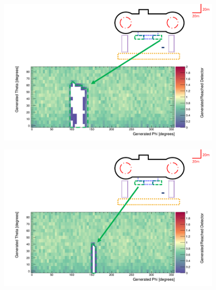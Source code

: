 \begin{figure}
 \centering
 \includegraphics[width=\linewidth]{Chapter5/Figs/wylfaRasterNew/serviceTowerCloseGen_Reached.png}
 \label{fig:serviceTowerCloseGen_Reached}
\end{figure}

\begin{figure}
 \centering
 \includegraphics[width=\linewidth]{Chapter5/Figs/wylfaRasterNew/serviceTowerFarGen_Reached.png}
 \label{fig:serviceTowerFarGen_Reached}
\end{figure}

